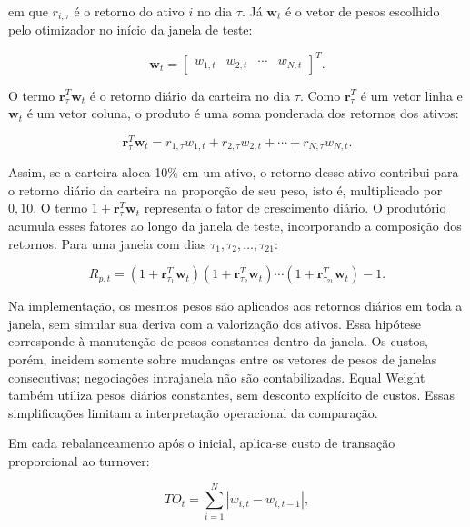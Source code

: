 \documentclass[12pt,a4paper]{article}
\begin{document}
em que $r_{i,\tau}$ é o retorno do ativo $i$ no dia $\tau$. Já $\mathbf{w}_t$ é o vetor de pesos escolhido pelo otimizador no início da janela de teste:

\begin{equation}
\mathbf{w}_t
=
\begin{bmatrix}
w_{1,t} & w_{2,t} & \cdots & w_{N,t}
\end{bmatrix}^{T}.
\end{equation}

O termo $\mathbf{r}_{\tau}^{T}\mathbf{w}_t$ é o retorno diário da carteira no dia $\tau$. Como $\mathbf{r}_{\tau}^{T}$ é um vetor linha e $\mathbf{w}_t$ é um vetor coluna, o produto é uma soma ponderada dos retornos dos ativos:

\begin{equation}
\mathbf{r}_{\tau}^{T}\mathbf{w}_t
=
r_{1,\tau}w_{1,t}
+r_{2,\tau}w_{2,t}
+\cdots
+r_{N,\tau}w_{N,t}.
\end{equation}

Assim, se a carteira aloca 10\% em um ativo, o retorno desse ativo contribui para o retorno diário da carteira na proporção de seu peso, isto é, multiplicado por $0{,}10$. O termo $1+\mathbf{r}_{\tau}^{T}\mathbf{w}_t$ representa o fator de crescimento diário. O produtório acumula esses fatores ao longo da janela de teste, incorporando a composição dos retornos. Para uma janela com dias $\tau_1,\tau_2,\ldots,\tau_{21}$:

\begin{equation}
R_{p,t}
=
\left(1+\mathbf{r}_{\tau_1}^{T}\mathbf{w}_t\right)
\left(1+\mathbf{r}_{\tau_2}^{T}\mathbf{w}_t\right)
\cdots
\left(1+\mathbf{r}_{\tau_{21}}^{T}\mathbf{w}_t\right)
-1.
\end{equation}

Na implementação, os mesmos pesos são aplicados aos retornos diários em toda a janela, sem simular sua deriva com a valorização dos ativos. Essa hipótese corresponde à manutenção de pesos constantes dentro da janela. Os custos, porém, incidem somente sobre mudanças entre os vetores de pesos de janelas consecutivas; negociações intrajanela não são contabilizadas. Equal Weight também utiliza pesos diários constantes, sem desconto explícito de custos. Essas simplificações limitam a interpretação operacional da comparação.

Em cada rebalanceamento após o inicial, aplica-se custo de transação proporcional ao turnover:

\begin{equation}
TO_t =
\sum_{i=1}^{N}
|w_{i,t} - w_{i,t-1}|,
\end{equation}
\end{document}
